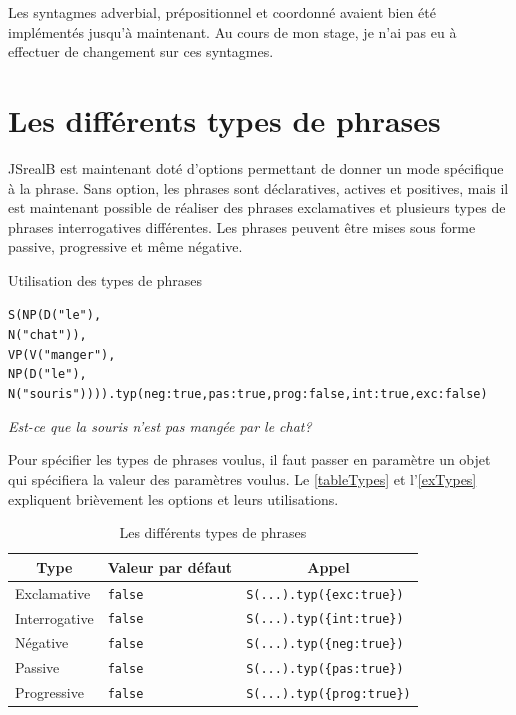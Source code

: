 \documentclass[11pt]{article} %
\newcommand{\system}[1]{\textsf{#1}}
\newcommand{\JSB}{\system{JSrealB}}
\newcommand{\real}[1]{\emph{#1}}
\begin{document}
Les syntagmes adverbial, prépositionnel et coordonné avaient bien
été implémentés jusqu'à maintenant. Au cours de mon stage, je n'ai
pas eu à effectuer de changement sur ces syntagmes.

\section{Les différents types de phrases}
\label{typePhrases}
\JSB{} est maintenant doté d'options permettant de donner un mode
spécifique à la phrase. Sans option, les phrases sont déclaratives, actives et positives,
mais il est maintenant possible de réaliser des phrases exclamatives
et plusieurs types de phrases interrogatives différentes. Les phrases 
peuvent être mises sous forme passive, progressive et même négative.

\begin{example}
\caption{Utilisation des types de phrases}
\begin{alltt}
S(NP(D("le"),
     N("chat")),
  VP(V("manger"),
     NP(D("le"),
        N("souris")))).typ({neg:true,pas:true,prog:false,int:true,exc:false})
\end{alltt} 
\real{Est-ce que la souris n'est pas mangée par le chat?}
\label{exTypes}
\end{example}

Pour spécifier les types de phrases voulus, il faut passer en paramètre
un objet qui spécifiera la valeur des paramètres voulus. Le \autoref{tableTypes} 
et l'\autoref{exTypes} 
expliquent brièvement les options et leurs utilisations.

\begin{table}[ht]
\centering
\caption{Les différents types de phrases}
\begin{tabular}{|l|l|l|}
\hline
\multicolumn{1}{|c}{Type} & \multicolumn{1}{|c}{Valeur par défaut} & \multicolumn{1}{|c|}{Appel}\\
\hline
Exclamative & \texttt{false} & \texttt{S(...).typ(\{exc:true\})} \\
\hline
Interrogative & \texttt{false} & \texttt{S(...).typ(\{int:true\})} \\
\hline
Négative & \texttt{false} & \texttt{S(...).typ(\{neg:true\})} \\
\hline
Passive & \texttt{false} & \texttt{S(...).typ(\{pas:true\})} \\
\hline
Progressive & \texttt{false} & \texttt{S(...).typ(\{prog:true\})} \\
\hline
\end{tabular}
\label{tableTypes}
\end{table}
\end{document}
